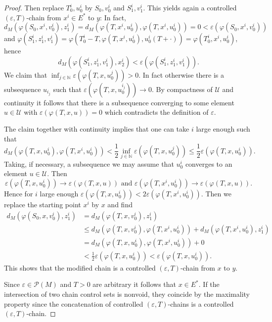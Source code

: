 \documentclass[preprint,12pt]{elsarticle}
\begin{document}
\begin{proof}
Then replace $T_{0}^{i},u_{0}^{i}$ by $S_{0},v_{0}^{i}$ and $S_{1}^{i}%
,v_{1}^{i}$. This yields again a controlled $(\varepsilon,T)$-chain from
$x^{i}\in E^{\ast}$ to $y$: In fact,%
\[
d_{M}(\varphi(S_{0},x^{i},v_{0}^{i}),z_{1}^{i})=d_{M}(\varphi(T,x^{i}%
,u_{0}^{i}),\varphi(T,x^{i},u_{0}^{i}))=0<\varepsilon(\varphi(S_{0}%
,x^{i},v_{0}^{i}))
\]
and $\varphi(S_{1}^{i},z_{1}^{i},v_{1}^{i})=\varphi(T_{0}^{i}-T,\varphi
(T,x^{i},u_{0}^{i}),u_{0}^{i}(T+\cdot))=\varphi(T_{0}^{i},x^{i},u_{0}^{i})$,
hence%
\[
d_{M}(\varphi(S_{1}^{i},z_{1}^{i},v_{1}^{i}),x_{2}^{i})<\varepsilon
(\varphi(S_{1}^{i},z_{1}^{i},v_{1}^{i})).
\]
We claim that $\inf_{j\in\mathbb{N}}\varepsilon(\varphi(T,x,u_{0}^{j}))>0$. In
fact otherwise there is a subsequence $u_{i_{j}}$ such that $\varepsilon
(\varphi(T,x,u_{0}^{i_{j}}))\rightarrow0$. By compactness of $\mathcal{U}$ and
continuity it follows that there is a subsequence converging to some element
$u\in\mathcal{U}$ with $\varepsilon\left(  \varphi(T,x,u)\right)  =0$ which
contradicts the definition of $\varepsilon$.

The claim together with continuity implies that one can take $i$ large enough
such that%
\[
d_{M}(\varphi(T,x,u_{0}^{i}),\varphi(T,x^{i},u_{0}^{i}))<\frac{1}{2}\inf
_{j\in\mathbb{N}}\varepsilon(\varphi(T,x,u_{0}^{j}))\leq\frac{1}{2}%
\varepsilon(\varphi(T,x,u_{0}^{i})).
\]
Taking, if necessary, a subsequence we may assume that $u_{0}^{i}$ converges
to an element $u\in\mathcal{U}$. Then
\[
\varepsilon(\varphi(T,x,u_{0}^{i}))\rightarrow\varepsilon(\varphi
(T,x,u))\text{ and }\varepsilon(\varphi(T,x^{i},u_{0}^{i}))\rightarrow
\varepsilon(\varphi(T,x,u)).
\]
Hence for $i$ large enough $\varepsilon(\varphi(T,x,u_{0}^{i}))<2\varepsilon
(\varphi(T,x^{i},u_{0}^{i}))$. Then we replace the starting point $x^{i}$ by
$x$ and find%
\begin{align*}
d_{M}(\varphi(S_{0},x,v_{0}^{i}),z_{1}^{i})  &  =d_{M}(\varphi(T,x,v_{0}%
^{i}),z_{1}^{i})\\
&  \leq d_{M}(\varphi(T,x,v_{0}^{i}),\varphi(T,x^{i},u_{0}^{i}))+d_{M}%
(\varphi(T,x^{i},u_{0}^{i}),z_{1}^{i})\\
&  =d_{M}(\varphi(T,x,u_{0}^{i}),\varphi(T,x^{i},u_{0}^{i}))+0\\
&  <\frac{1}{2}\varepsilon(\varphi(T,x,u_{0}^{i}))<\varepsilon(\varphi
(T,x,u_{0}^{i})).
\end{align*}
This shows that the modified chain is a controlled $(\varepsilon,T)$-chain
from $x$ to $y$.

Since $\varepsilon\in\mathcal{P}(M)$ and $T>0$ are arbitrary it follows that
$x\in E^{\ast}$. If the intersection of two chain control sets is nonvoid,
they coincide by the maximality property since the concatenation of controlled
$(\varepsilon,T)$-chains is a controlled $(\varepsilon,T)$-chain.


\end{proof}
\end{document}
